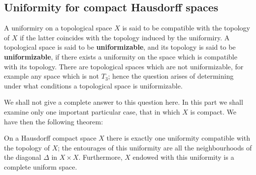 \subsection{Uniformity for compact Hausdorff spaces}
A uniformiry on a topological space $X$ is said to be compatible with the topology of $X$ if the latter coincides with the topology induced by the uniformiry. A topological space is said to be \textbf{uniformizable}, and its topology is said to be \textbf{uniformizable}, if there exists a uniformity on the space which is compatible with its topology. There are topological spaces which are not uniformizable, for example any space which is not $T_3$; hence the question arises of determining under what conditions a topological space is uniformizable.\par
We shall not give a complete answer to this question here. In this part we shall examine only one important particular case, that in which $X$ is compact. We have then the following theorem:
\begin{theorem}\label{uniformity on compact space}
On a Hausdorff compact space $X$ there is exactly one uniformity compatible with the topology of $X$; the entourages of this uniformity are all the neighbourhoods of the diagonal $\Delta$ in $X\times X$. Furthermore, $X$ endowed with this uniformity is a complete uniform space.
\end{theorem}
